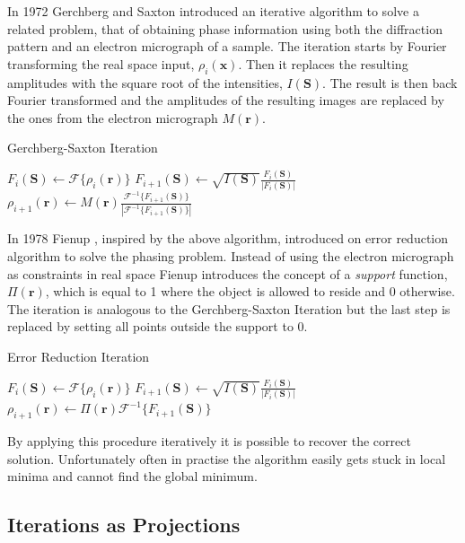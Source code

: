 In 1972 Gerchberg and Saxton \cite{Gerchberg1972Practical} introduced an iterative algorithm to solve
a related problem, that of obtaining phase information using both the
diffraction pattern and an electron micrograph of a sample. The iteration starts
by Fourier transforming the real space input, $\rho_i(\mathbf x)$. Then it
replaces the resulting amplitudes with the square root of the intensities,
$I(\mathbf S)$. The result is then back Fourier transformed and the amplitudes
of the resulting images are replaced by the ones from the electron micrograph $M(\mathbf r)$.
\begin{algorithm}
\caption{Gerchberg-Saxton Iteration}
\begin{algorithmic}
  \STATE $F_{i}(\mathbf S) \gets \mathscr{F}\{\rho_i(\mathbf r)\}$
  \STATE $F_{i+1}(\mathbf S) \gets \sqrt{I(\mathbf S)} \frac{F_i(\mathbf S)}{|F_i(\mathbf S)|}$
  \STATE $\rho_{i+1}(\mathbf r) \gets M(\mathbf r)
  \frac{\mathscr{F}^{-1}\{F_{i+1}(\mathbf
    S)\}}{|\mathscr{F}^{-1}\{F_{i+1}(\mathbf S)\}|}$
\end{algorithmic}
\end{algorithm}

In 1978 Fienup \cite{Fienup1978Reconstruction}, inspired by the above algorithm, introduced on error
reduction algorithm to solve the phasing problem. Instead of using the electron
micrograph as constraints in real space Fienup introduces the concept of a {\em
  support} function, $\Pi(\mathbf r)$, which is equal to 1 where the
object is allowed to reside and 0 otherwise. 
The iteration is analogous to the Gerchberg-Saxton Iteration but the last step is replaced
by setting all points outside the support to 0.
\begin{algorithm}
\caption{Error Reduction Iteration}
\begin{algorithmic}
  \STATE $F_{i}(\mathbf S) \gets \mathscr{F}\{\rho_i(\mathbf r)\}$
  \STATE $F_{i+1}(\mathbf S) \gets \sqrt{I(\mathbf S)} \frac{F_i(\mathbf S)}{|F_i(\mathbf S)|}$
  \STATE $\rho_{i+1}(\mathbf r) \gets \Pi(\mathbf r) \mathscr{F}^{-1}\{F_{i+1}(\mathbf S)\}$
\end{algorithmic}
\end{algorithm}

By applying this procedure iteratively it is possible to recover the correct
solution. 
Unfortunately
often 
 in practise the algorithm easily gets stuck in
local minima and cannot find the global minimum.

\subsection{Iterations as Projections}

